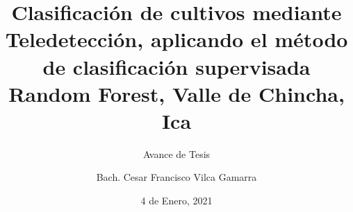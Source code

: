 
\title[Avance de Tesis]{
	Clasificación de cultivos mediante Teledetección,
	aplicando el método de clasificación supervisada
	Random Forest, Valle de Chincha, Ica
}

\subtitle{Avance de Tesis}

\author[Bach. Cesar F. Vilca Gamarra]{Bach. Cesar Francisco Vilca Gamarra}

\date[Enero, 2021]{4 de Enero, 2021}


